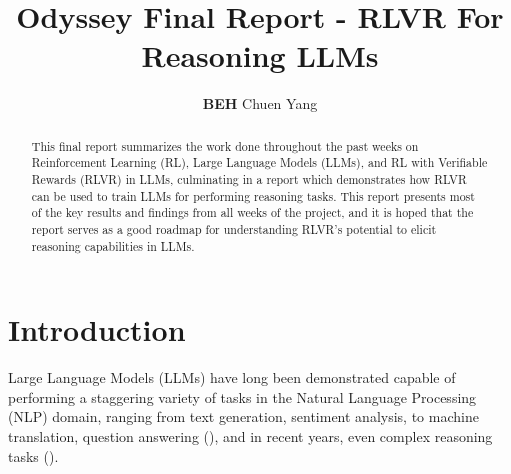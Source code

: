 \documentclass{article} %
\title{Odyssey Final Report - RLVR For Reasoning LLMs}
\author{\textbf{BEH} Chuen Yang}
\theoremstyle{definition}
\begin{document}
\ifcolmsubmission
\linenumbers
\fi

\maketitle


\begin{abstract}
    This final report summarizes the work done throughout the past weeks on Reinforcement Learning (RL), Large Language Models (LLMs),
    and RL with Verifiable Rewards (RLVR) in LLMs, culminating in a report which demonstrates
    how RLVR can be used to train LLMs for performing reasoning tasks.
    This report presents most of the key results and findings from all weeks of the project, and it is hoped
    that the report serves as a good roadmap for understanding RLVR's potential to elicit reasoning capabilities in LLMs.
\end{abstract}

\section{Introduction}
Large Language Models (LLMs) have long been demonstrated capable of performing a staggering variety of tasks
in the Natural Language Processing (NLP) domain, ranging from text generation, 
sentiment analysis, to machine translation, question answering (\cite{Brown-et-al-2020}),
and in recent years, even complex reasoning tasks (\cite{tulu3, grpo, r1}).
\end{document}
